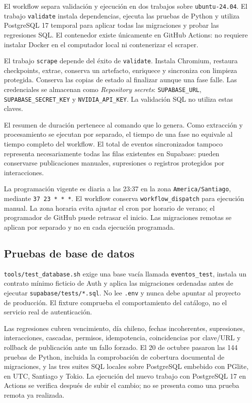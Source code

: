\documentclass[11pt,a4paper]{article}
\begin{document}
El workflow separa validaci\'{o}n y ejecuci\'{o}n en dos trabajos sobre \texttt{ubuntu-24.04}. El trabajo \texttt{validate} instala dependencias, ejecuta las pruebas de Python y utiliza PostgreSQL 17 temporal para aplicar todas las migraciones y probar las regresiones SQL. El contenedor existe \'{u}nicamente en GitHub Actions: no requiere instalar Docker en el computador local ni contenerizar el scraper.

El trabajo \texttt{scrape} depende del \'{e}xito de \texttt{validate}. Instala Chromium, restaura checkpoints, extrae, conserva un artefacto, enriquece y sincroniza con limpieza protegida. Conserva las copias de estado al finalizar aunque una fase falle. Las credenciales se almacenan como \textit{Repository secrets}: \texttt{SUPABASE\_URL}, \texttt{SUPABASE\_SECRET\_KEY} y \texttt{NVIDIA\_API\_KEY}. La validaci\'{o}n SQL no utiliza estas claves.

El resumen de duraci\'{o}n pertenece al comando que lo genera. Como extracci\'{o}n y procesamiento se ejecutan por separado, el tiempo de una fase no equivale al tiempo completo del workflow. El total de eventos sincronizados tampoco representa necesariamente todas las filas existentes en Supabase: pueden conservarse publicaciones manuales, supresiones o registros protegidos por interacciones.

La programaci\'{o}n vigente es diaria a las 23:37 en la zona \texttt{America/Santiago}, mediante \texttt{37 23 * * *}. El workflow conserva \texttt{workflow\_dispatch} para ejecuci\'{o}n manual. La zona horaria evita ajustar el cron por horario de verano; el programador de GitHub puede retrasar el inicio. Las migraciones remotas se aplican por separado y no en cada ejecuci\'{o}n programada.

\subsection{Pruebas de base de datos}

\texttt{tools/test\_database.sh} exige una base vac\'{i}a llamada \texttt{eventos\_test}, instala un contrato m\'{i}nimo ficticio de Auth y aplica las migraciones ordenadas antes de ejecutar \texttt{supabase/tests/*.sql}. No lee \texttt{.env} y nunca debe apuntar al proyecto de producci\'{o}n. El fixture comprueba el comportamiento del cat\'{a}logo, no el servicio real de autenticaci\'{o}n.

Las regresiones cubren vencimiento, d\'{i}a chileno, fechas incoherentes, supresiones, interacciones, cascadas, permisos, idempotencia, coincidencias por clave/URL y rollback de publicaci\'{o}n ante un fallo forzado. El 20 de octubre pasaron las 144 pruebas de Python, incluida la comprobaci\'{o}n de cobertura documental de migraciones, y las tres suites SQL locales sobre PostgreSQL embebido con PGlite, en UTC, Santiago y Tokio. La ejecuci\'{o}n del nuevo trabajo con PostgreSQL 17 en Actions se verifica despu\'{e}s de subir el cambio; no se presenta como una prueba remota ya realizada.
\end{document}
